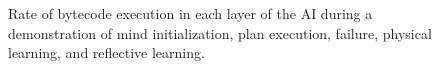 \begin{figure}
\caption[Rate of bytecode execution in each layer of the AI during a
  demonstration.]{Rate of bytecode execution in each layer of the AI
  during a demonstration of mind initialization, plan execution,
  failure, physical learning, and reflective learning.}
\label{figure:mind_plot_data}
\end{figure}


